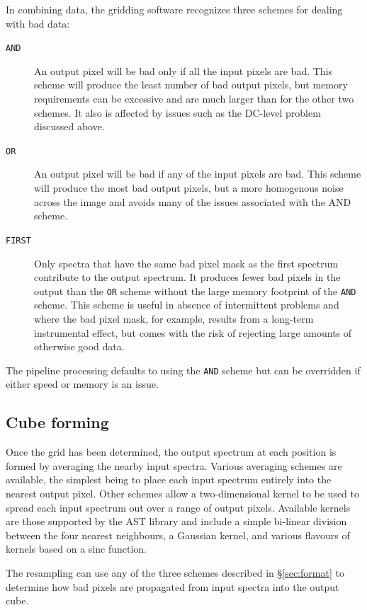\documentclass[final,authoryear,5p,times,twocolumn]{elsarticle}
\begin{document}
In combining data, the gridding software recognizes three schemes for
dealing with bad data:
\begin{description}
\item[\texttt{AND}] An output pixel will be bad only if all the input
   pixels are bad. This scheme will produce the least number of bad
   output pixels, but memory requirements can be excessive and are much
   larger than for the other two schemes. It also is affected by issues such
   as the DC-level problem discussed above.
\item[\texttt{OR}] An output pixel will be bad if any of the input
   pixels are bad. This scheme will produce the most bad output pixels,
   but a more homogenous noise across the image and avoids many
   of the issues associated with the AND scheme.
\item[\texttt{FIRST}] Only spectra that have the same bad pixel mask
   as the first spectrum contribute to the output spectrum. It
   produces fewer bad pixels in the output than the \texttt{OR}
   scheme without the large memory footprint of the \texttt{AND} scheme.
   This scheme is useful in absence of intermittent problems and where
   the bad pixel mask, for example, results from a long-term instrumental effect, but
   comes with the risk of rejecting large amounts of otherwise good data.
\end{description}

The pipeline processing defaults to using the \texttt{AND} scheme but
can be overridden if either speed or memory is an issue.

\subsection{Cube forming}

Once the grid has been determined, the output spectrum at each
position is formed by averaging the nearby input spectra. Various
averaging schemes are available, the simplest being to place each
input spectrum entirely into the nearest output pixel. Other schemes
allow a two-dimensional kernel to be used to spread each input spectrum
out over a range of output pixels. Available kernels are those
supported by the AST library \citep{SUN211,2012ASPC..461..825B} and
include a simple bi-linear division between the four nearest
neighbours, a Gaussian kernel, and various flavours of kernels based
on a sinc function.

The resampling can use any of the three schemes described in
\S\ref{sec:format} to determine how bad pixels are propagated
from input spectra into the output cube.
\end{document}
